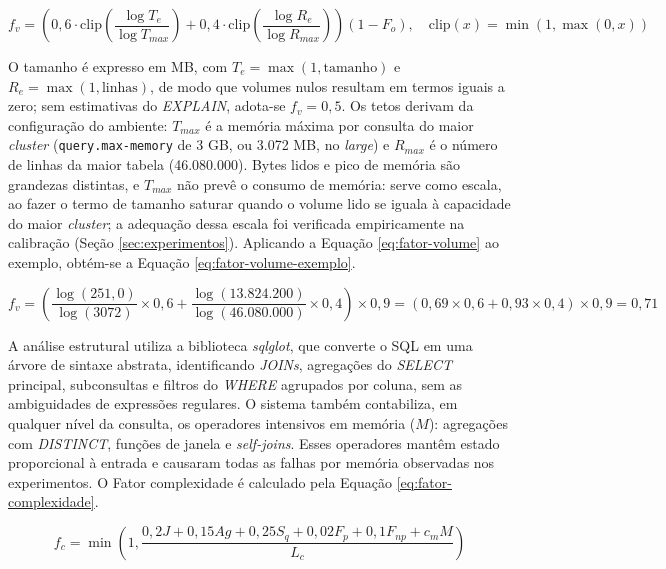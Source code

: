 \begin{equation}
\label{eq:fator-volume}
f_v = \left( 0,6 \cdot \mathrm{clip}\!\left(\frac{\log T_e}{\log T_{max}}\right) + 0,4 \cdot \mathrm{clip}\!\left(\frac{\log R_e}{\log R_{max}}\right) \right) (1 - F_o), \quad \mathrm{clip}(x) = \min(1, \max(0, x))
\end{equation}

O tamanho é expresso em MB, com $T_e = \max(1, \mathrm{tamanho})$ e $R_e = \max(1, \mathrm{linhas})$, de modo que volumes nulos resultam em termos iguais a zero; sem estimativas do \textit{EXPLAIN}, adota-se $f_v = 0,5$. Os tetos derivam da configuração do ambiente: $T_{max}$ é a memória máxima por consulta do maior \textit{cluster} (\texttt{query.\allowbreak max-memory} de 3 GB, ou 3.072 MB, no \textit{large}) e $R_{max}$ é o número de linhas da maior tabela (46.080.000). Bytes lidos e pico de memória são grandezas distintas, e $T_{max}$ não prevê o consumo de memória: serve como escala, ao fazer o termo de tamanho saturar quando o volume lido se iguala à capacidade do maior \textit{cluster}; a adequação dessa escala foi verificada empiricamente na calibração (Seção \ref{sec:experimentos}). Aplicando a Equação \ref{eq:fator-volume} ao exemplo, obtém-se a Equação \ref{eq:fator-volume-exemplo}.

\begin{equation}
\label{eq:fator-volume-exemplo}
f_v = \left( \frac{\log(251,0)}{\log(3072)} \times 0,6 + \frac{\log(13.824.200)}{\log(46.080.000)} \times 0,4 \right) \times 0,9 = (0,69 \times 0,6 + 0,93 \times 0,4) \times 0,9 = 0,71
\end{equation}

A análise estrutural utiliza a biblioteca \textit{sqlglot}, que converte o SQL em uma árvore de sintaxe abstrata, identificando \textit{JOINs}, agregações do \textit{SELECT} principal, subconsultas e filtros do \textit{WHERE} agrupados por coluna, sem as ambiguidades de expressões regulares. O sistema também contabiliza, em qualquer nível da consulta, os operadores intensivos em memória ($M$): agregações com \textit{DISTINCT}, funções de janela e \textit{self-joins}. Esses operadores mantêm estado proporcional à entrada e causaram todas as falhas por memória observadas nos experimentos. O Fator complexidade é calculado pela Equação \ref{eq:fator-complexidade}.

\begin{equation}
\label{eq:fator-complexidade}
f_c = \min\left(1, \frac{0,2 J + 0,15 Ag + 0,25 S_q + 0,02 F_p + 0,1 F_{np} + c_m M}{L_c}\right)
\end{equation}


